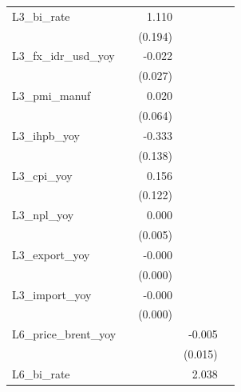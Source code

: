 {\begin{tabular}{l*{4}{D{.}{.}{-1}}}
\addlinespace
L3\_bi\_rate      &                  &    1.110\sym{***}&                  &                  \\
                &                  &  (0.194)         &                  &                  \\
\addlinespace
L3\_fx\_idr\_usd\_yoy&                  &   -0.022         &                  &                  \\
                &                  &  (0.027)         &                  &                  \\
\addlinespace
L3\_pmi\_manuf    &                  &    0.020         &                  &                  \\
                &                  &  (0.064)         &                  &                  \\
\addlinespace
L3\_ihpb\_yoy     &                  &   -0.333\sym{**} &                  &                  \\
                &                  &  (0.138)         &                  &                  \\
\addlinespace
L3\_cpi\_yoy      &                  &    0.156         &                  &                  \\
                &                  &  (0.122)         &                  &                  \\
\addlinespace
L3\_npl\_yoy      &                  &    0.000         &                  &                  \\
                &                  &  (0.005)         &                  &                  \\
\addlinespace
L3\_export\_yoy   &                  &   -0.000         &                  &                  \\
                &                  &  (0.000)         &                  &                  \\
\addlinespace
L3\_import\_yoy   &                  &   -0.000         &                  &                  \\
                &                  &  (0.000)         &                  &                  \\
\addlinespace
L6\_price\_brent\_yoy&                  &                  &   -0.005         &                  \\
                &                  &                  &  (0.015)         &                  \\
\addlinespace
L6\_bi\_rate      &                  &                  &    2.038\sym{**} &                  \\

\end{tabular}}
